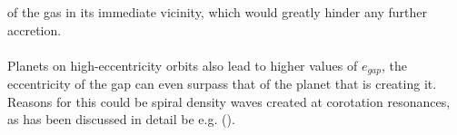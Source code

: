       of the gas in its immediate vicinity, which would greatly hinder any 
      further accretion. \\
      \\
      Planets on high-eccentricity orbits also lead to higher values of 
      $e_{gap}$, the eccentricity of the gap can even surpass that of the 
      planet that is creating it. Reasons for this could be spiral density 
      waves created at corotation resonances, as has been discussed in detail 
      be e.g. \citeauthor{Hosseinbor_2007} (\citeyear{Hosseinbor_2007}).
 
    \clearpage

